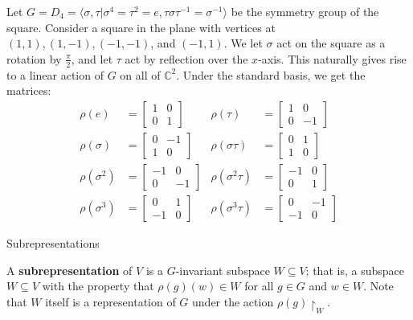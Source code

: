\begin{frame}[plain]
\begin{example}
Let $G = D_4 = \langle \sigma, \tau |  \sigma^4 = \tau^2 = e, \tau \sigma \tau^{-1} = \sigma^{-1} \rangle$ be the symmetry group of the square.  \pause Consider a square in the plane with vertices at $(1,1), (1,-1), (-1, -1)$, and $(-1, 1)$.  \pause We let $\sigma$ act on the square as a rotation by $\frac{\pi}{2}$, and let $\tau$ act by reflection over the $x$-axis.  This naturally gives rise to a linear action of $G$ on all of $\mathbb{C}^2$.  \pause  Under the standard basis, we get the matrices:
\begin{align*}
\rho( e) &= \begin{bmatrix} 1 & 0 \\ 0 & 1\end{bmatrix}  &\rho (\tau) &= \begin{bmatrix} 1 & 0 \\ 0 & -1\end{bmatrix} \\
\rho (\sigma) &= \begin{bmatrix} 0 & -1 \\ 1 & 0  \end{bmatrix} & \rho (\sigma \tau ) &= \begin{bmatrix} 0 & 1 \\ 1 & 0\end{bmatrix} \\
\rho (\sigma^2) &= \begin{bmatrix} -1 & 0 \\ 0 & -1  \end{bmatrix} & \rho (\sigma^2 \tau) &= \begin{bmatrix} -1 & 0 \\ 0 & 1\end{bmatrix} \\
\rho (\sigma^3) &= \begin{bmatrix} 0 & 1 \\ -1 & 0  \end{bmatrix} & \rho (\sigma^3 \tau) &= \begin{bmatrix} 0 & -1 \\ -1 & 0\end{bmatrix}
\end{align*}
\end{example}
\end{frame}

\begin{frame}{Subrepresentations}
\begin{definition} A \textbf{subrepresentation} of $V$ is a $G$-invariant subspace $W \subseteq V$; that is, a subspace $W \subseteq V$ with the property that $\rho(g) (w) \in W$ for all $g \in G$ and $w \in W$.  Note that $W$ itself is a representation of $G$ under the action $\rho(g) \restriction_W$.
\end{definition}
\end{frame}

